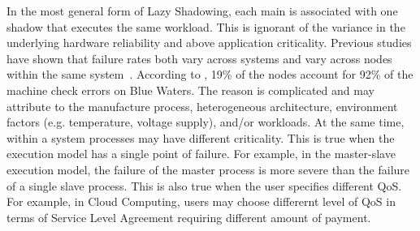 In the most general form of Lazy Shadowing, each main is associated with one shadow that executes the same workload. This is ignorant of the variance in the underlying hardware reliability and above application criticality. Previous studies have shown that failure rates both vary across systems and vary across nodes within the same system~\cite{schroeder2007,di2014lessons}. According to \cite{di2014lessons}, 19\% of the nodes account for 92\% of the machine check errors on Blue Waters. The reason is complicated and may attribute to the manufacture process, heterogeneous architecture, environment factors (e.g. temperature, voltage supply), and/or workloads. At the same time, within a system processes may have different criticality. This is true when the execution model has a single point of failure. For example, in the master-slave execution model, the failure of the master process is more severe than the failure of a single slave process. This is also true when the user specifies different QoS. For example, in Cloud Computing, users may choose differernt level of QoS in terms of Service Level Agreement requiring different amount of payment. 